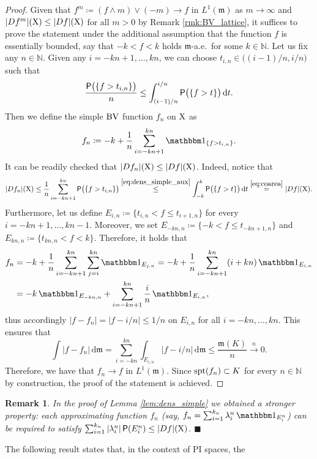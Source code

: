 \documentclass[reqno]{amsart}
\numberwithin{equation}{section}
\newcommand{\N}{\mathbb{N}}
\newcommand{\X}{{\rm X}}
\newcommand{\mm}{\mathfrak m}
\renewcommand{\d}{{\mathrm d}}
\newcommand{\1}{\mathbbm 1}
\newcommand{\BV}{{\rm BV}}
\renewcommand{\P}{{\sf P}}
\newcommand{\fr}{\penalty-20\null\hfill\(\blacksquare\)}
\newtheorem{remark}[theorem]{Remark}
\begin{document}
\begin{proof}
Given that \(f^m\coloneqq(f\wedge m)\vee(-m)\to f\) in \(L^1(\mm)\)
as \(m\to\infty\) and \(|Df^m|(\X)\leq|Df|(\X)\) for all \(m>0\) by Remark
\ref{rmk:BV_lattice}, it suffices to prove the statement under the additional
assumption that the function \(f\) is essentially bounded, say that \(-k<f<k\)
holds \(\mm\)-a.e.\ for some \(k\in\N\). Let us fix any \(n\in\N\). Given any
\(i=-kn+1,\ldots,kn\), we can choose \(t_{i,n}\in\big((i-1)/n,i/n\big)\) such that
\begin{equation}\label{eq:dens_simple_aux}
\frac{\P\big(\{f>t_{i,n}\}\big)}{n}\leq\int_{(i-1)/n}^{i/n}\P\big(\{f>t\}\big)\,\d t.
\end{equation}
Then we define the simple \(\BV\) function \(f_n\) on \(\X\) as
\[
f_n\coloneqq-k+\frac{1}{n}\sum_{i=-kn+1}^{kn}\1_{\{f>t_{i,n}\}}.
\]
It can be readily checked that \(|Df_n|(\X)\leq|Df|(\X)\). Indeed, notice that
\[
|Df_n|(\X)\leq\frac{1}{n}\sum_{i=-kn+1}^{kn}\P\big(\{f>t_{i,n}\}\big)
\overset{\eqref{eq:dens_simple_aux}}\leq\int_{-k}^k\P\big(\{f>t\}\big)\,\d t
\overset{\eqref{eq:coarea}}=|Df|(\X).
\]
Furthermore, let us define \(E_{i,n}\coloneqq\{t_{i,n}<f\leq t_{i+1,n}\}\)
for every \(i=-kn+1,\ldots,kn-1\). Moreover, we set
\(E_{-kn,n}\coloneqq\{-k<f\leq t_{-kn+1,n}\}\)
and \(E_{kn,n}\coloneqq\{t_{kn,n}<f<k\}\). Therefore, it holds that
\[\begin{split}
f_n&=-k+\frac{1}{n}\sum_{i=-kn+1}^{kn}\sum_{j=i}^{kn}\1_{E_{j,n}}=
-k+\frac{1}{n}\sum_{i=-kn+1}^{kn}(i+kn)\,\1_{E_{i,n}}\\
&=-k\,\1_{E_{-kn,n}}+\sum_{i=-kn+1}^{kn}\frac{i}{n}\,\1_{E_{i,n}},
\end{split}\]
thus accordingly \(|f-f_n|=|f-i/n|\leq 1/n\) on \(E_{i,n}\) for all
\(i=-kn,\ldots,kn\). This ensures that
\[
\int|f-f_n|\,\d\mm=\sum_{i=-kn}^{kn}\int_{E_{i,n}}|f-i/n|\,\d\mm
\leq\frac{\mm(K)}{n}\overset{n}\longrightarrow 0.
\]
Therefore, we have that \(f_n\to f\) in \(L^1(\mm)\). Since \({\rm spt}(f_n)\subset K\)
for every \(n\in\N\) by construction, the proof of the statement is achieved.
\end{proof}
%
%
\begin{remark}\label{rmk:stronger_dens_simple}{\rm
In the proof of Lemma \ref{lem:dens_simple} we obtained a stronger property:
each approximating function \(f_n\) (say, \(f_n=\sum_{i=1}^{k_n}\lambda^n_i\,\1_{E^n_i}\))
can be required to satisfy \(\sum_{i=1}^{k_n}|\lambda^n_i|\,\P(E^n_i)\leq|Df|(\X)\). 
\fr}\end{remark}
%
%
The following result states that, in the context of PI spaces, the
\end{document}

